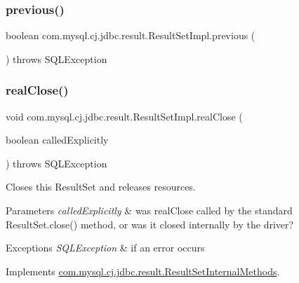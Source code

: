 \subsubsection{\texorpdfstring{previous()}{previous()}}
{\footnotesize\ttfamily boolean com.\+mysql.\+cj.\+jdbc.\+result.\+Result\+Set\+Impl.\+previous (\begin{DoxyParamCaption}{ }\end{DoxyParamCaption}) throws S\+Q\+L\+Exception}

\mbox{\label{classcom_1_1mysql_1_1cj_1_1jdbc_1_1result_1_1_result_set_impl_a33dfcef00d2e567cee58610ade647321}} 
\subsubsection{\texorpdfstring{real\+Close()}{realClose()}}
{\footnotesize\ttfamily void com.\+mysql.\+cj.\+jdbc.\+result.\+Result\+Set\+Impl.\+real\+Close (\begin{DoxyParamCaption}\item[{boolean}]{called\+Explicitly }\end{DoxyParamCaption}) throws S\+Q\+L\+Exception}

Closes this Result\+Set and releases resources.


\begin{DoxyParams}{Parameters}
{\em called\+Explicitly} & was real\+Close called by the standard Result\+Set.\+close() method, or was it closed internally by the driver?\\
\hline
\end{DoxyParams}

\begin{DoxyExceptions}{Exceptions}
{\em S\+Q\+L\+Exception} & if an error occurs \\
\hline
\end{DoxyExceptions}


Implements \mbox{\hyperlink{interfacecom_1_1mysql_1_1cj_1_1jdbc_1_1result_1_1_result_set_internal_methods_a0102042bd0710772308db537f40e2286}{com.\+mysql.\+cj.\+jdbc.\+result.\+Result\+Set\+Internal\+Methods}}.

